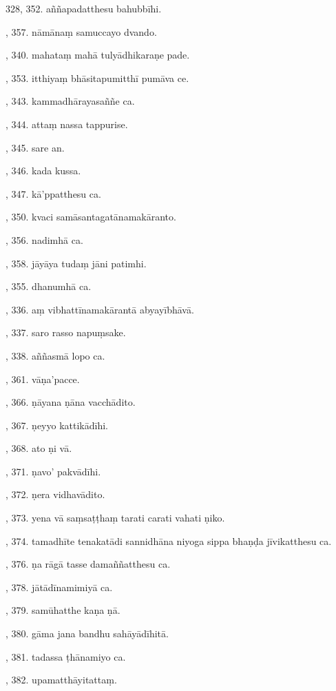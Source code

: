 328, 352. aññapadatthesu bahubbīhi.\par {}, 357. nāmānaṃ samuccayo dvando.\par {}, 340. mahataṃ mahā tulyādhikaraṇe pade.\par {}, 353. itthiyaṃ bhāsitapumitthī pumāva ce.\par {}, 343. kammadhārayasaññe ca.\par {}, 344. attaṃ nassa tappurise.\par {}, 345. sare an.\par {}, 346. kada kussa.\par {}, 347. kā’ppatthesu ca.\par {}, 350. kvaci samāsantagatānamakāranto.\par {}, 356. nadimhā ca.\par {}, 358. jāyāya tudaṃ jāni patimhi.\par {}, 355. dhanumhā ca.\par {}, 336. aṃ vibhattīnamakārantā abyayībhāvā.\par {}, 337. saro rasso napuṃsake.\par {}, 338. aññasmā lopo ca.\par {}, 361. vāṇa’pacce.\par {}, 366. ṇāyana ṇāna vacchādito.\par {}, 367. ṇeyyo kattikādīhi.\par {}, 368. ato ṇi vā.\par {}, 371. ṇavo’ pakvādīhi.\par {}, 372. ṇera vidhavādito.\par {}, 373. yena vā saṃsaṭṭhaṃ tarati carati vahati ṇiko.\par {}, 374. tamadhīte tenakatādi sannidhāna niyoga sippa bhaṇḍa jīvikatthesu ca.\par {}, 376. ṇa rāgā tasse damaññatthesu ca.\par {}, 378. jātādīnamimiyā ca.\par {}, 379. samūhatthe kaṇa ṇā.\par {}, 380. gāma jana bandhu sahāyādīhitā.\par {}, 381. tadassa ṭhānamiyo ca.\par {}, 382. upamatthāyitattaṃ.\par \noindent
